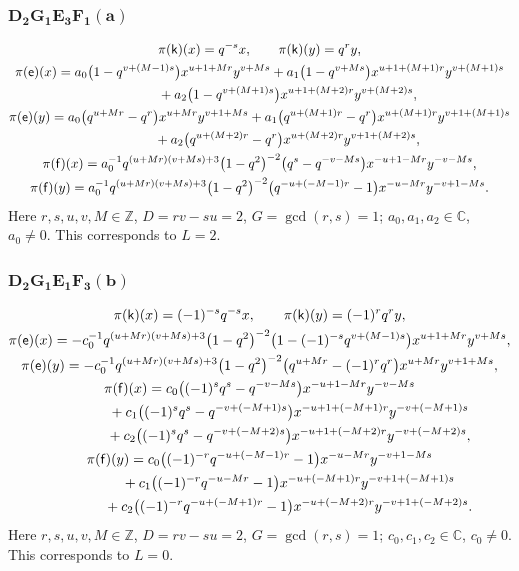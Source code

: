 \documentclass[10pt,a4paper]{amsart}
\numberwithin{equation}{section}
\begin{document}
\subsubsection*{$\boldsymbol{D_2G_1E_3F_1(a)}$}
\begin{gather*}
\pi(\mathsf{k})(x)= q^{-s}x ,\qquad\pi(\mathsf{k})(y)=q^ry ,\\
\pi(\mathsf{e})(x)= a_0\big(1-q^{v+(M-1)s}\big)x^{u+1+Mr}y^{v+Ms}+ a_1\big(1-q^{v+Ms}\big)x^{u+1+(M+1)r}y^{v+(M+1)s}\\
\hphantom{\pi(\mathsf{e})(x)=}{}+ a_2\big(1-q^{v+(M+1)s}\big)x^{u+1+(M+2)r}y^{v+(M+2)s} ,\\
\pi(\mathsf{e})(y)= a_0\big(q^{u+Mr}-q^r\big)x^{u+Mr}y^{v+1+Ms}+ a_1\big(q^{u+(M+1)r}-q^r\big)x^{u+(M+1)r}y^{v+1+(M+1)s}\\
\hphantom{\pi(\mathsf{e})(y)=}{} + a_2\big(q^{u+(M+2)r}-q^r\big)x^{u+(M+2)r}y^{v+1+(M+2)s} ,\\
\pi(\mathsf{f})(x)= a_0^{-1}q^{(u+Mr)(v+Ms)+3}\big(1-q^2\big)^{-2}\big(q^s-q^{-v-Ms}\big)x^{-u+1-Mr}y^{-v-Ms} ,\\
\pi(\mathsf{f})(y)= a_0^{-1}q^{(u+Mr)(v+Ms)+3}\big(1-q^2\big)^{-2}\big(q^{-u+(-M-1)r}-1\big)x^{-u-Mr}y^{-v+1-Ms} .
\end{gather*}
Here $r,s,u,v,M\in\mathbb{Z}$, $D=rv-su=2$, $G=\operatorname{gcd}(r,s)=1$; $a_0,a_1,a_2\in\mathbb{C}$, $a_0\ne 0$. This corresponds to $L=2$.

\subsubsection*{$\boldsymbol{D_2G_1E_1F_3(b)}$}
\begin{gather*}
\pi(\mathsf{k})(x)= (-1)^{-s}q^{-s}x ,\qquad\pi(\mathsf{k})(y)=(-1)^rq^ry ,\\
\pi(\mathsf{e})(x)= -c_0^{-1}q^{(u+Mr)(v+Ms)+3}\big(1-q^2\big)^{-2}\big(1-(-1)^{-s}q^{v+(M-1)s}\big)x^{u+1+Mr}y^{v+Ms} ,\\
\pi(\mathsf{e})(y)= -c_0^{-1}q^{(u+Mr)(v+Ms)+3}\big(1-q^2\big)^{-2}\big(q^{u+Mr}-(-1)^rq^r\big)x^{u+Mr}y^{v+1+Ms} ,\\
\pi(\mathsf{f})(x)= c_0\big((-1)^sq^s-q^{-v-Ms}\big)x^{-u+1-Mr}y^{-v-Ms}\\
\hphantom{\pi(\mathsf{f})(x)=}{}+ c_1\big((-1)^sq^s-q^{-v+(-M+1)s}\big)x^{-u+1+(-M+1)r}y^{-v+(-M+1)s}\\
\hphantom{\pi(\mathsf{f})(x)=}{}+ c_2\big((-1)^sq^s-q^{-v+(-M+2)s}\big)x^{-u+1+(-M+2)r}y^{-v+(-M+2)s} ,\\
\pi(\mathsf{f})(y)= c_0\big((-1)^{-r}q^{-u+(-M-1)r}-1\big)x^{-u-Mr}y^{-v+1-Ms}\\
\hphantom{\pi(\mathsf{f})(y)=}{}+ c_1\big((-1)^{-r}q^{-u-Mr}-1\big)x^{-u+(-M+1)r}y^{-v+1+(-M+1)s}\\
\hphantom{\pi(\mathsf{f})(y)=}{}+ c_2\big((-1)^{-r}q^{-u+(-M+1)r}-1\big)x^{-u+(-M+2)r}y^{-v+1+(-M+2)s} .
\end{gather*}
Here $r,s,u,v,M\in\mathbb{Z}$, $D=rv-su=2$, $G=\operatorname{gcd}(r,s)=1$; $c_0,c_1,c_2\in\mathbb{C}$, $c_0\ne 0$. This corresponds to $L=0$.
\end{document}
